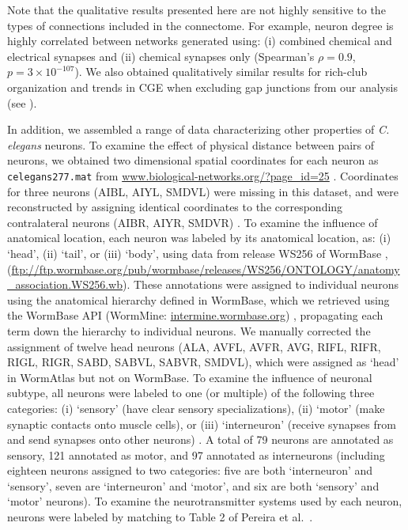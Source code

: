 \documentclass[10pt,letterpaper]{article}
\begin{document}
Note that the qualitative results presented here are not highly sensitive to the types of connections included in the connectome.
For example, neuron degree is highly correlated between networks generated using: (i) combined chemical and electrical synapses and (ii) chemical synapses only (Spearman's $\rho= 0.9$, $p = 3 \times 10^{-107}$).
We also obtained qualitatively similar results for rich-club organization and trends in CGE when excluding gap junctions from our analysis (see ).

In addition, we assembled a range of data characterizing other properties of \emph{C. elegans} neurons.
To examine the effect of physical distance between pairs of neurons, we obtained two dimensional spatial coordinates for each neuron as \texttt{celegans277.mat} from \url{www.biological-networks.org/?page_id=25} \cite{choe2004network}.
Coordinates for three neurons (AIBL, AIYL, SMDVL) were missing in this dataset, and were reconstructed by assigning identical coordinates to the corresponding contralateral neurons (AIBR, AIYR, SMDVR) \cite{Varier2011}.
To examine the influence of anatomical location, each neuron was labeled by its anatomical location, as:
(i) `head', (ii) `tail', or (iii) `body', using data from release WS256 of WormBase \cite{Harris:2009kd}, (\url{ftp://ftp.wormbase.org/pub/wormbase/releases/WS256/ONTOLOGY/anatomy_association.WS256.wb}).
These annotations were assigned to individual neurons using the anatomical hierarchy defined in WormBase, which we retrieved using the WormBase API (WormMine: \url{intermine.wormbase.org}) \cite{Harris:2009kd}, propagating each term down the hierarchy to individual neurons.
We manually corrected the assignment of twelve head neurons (ALA, AVFL, AVFR, AVG, RIFL, RIFR, RIGL, RIGR, SABD, SABVL, SABVR, SMDVL), which were assigned as `head' in WormAtlas \cite{WormAtlas} but not on WormBase.
To examine the influence of neuronal subtype, all neurons were labeled to one (or multiple) of the following three categories:
(i) `sensory' (have clear sensory specializations),
(ii) `motor' (make synaptic contacts onto muscle cells), or
(iii) `interneuron' (receive synapses from and send synapses onto other neurons) \cite{White:1986tx}.
A total of 79 neurons are annotated as sensory, 121 annotated as motor, and 97 annotated as interneurons (including eighteen neurons assigned to two categories: five are both `interneuron' and `sensory', seven are `interneuron' and `motor', and six are both `sensory' and `motor' neurons).
To examine the neurotransmitter systems used by each neuron, neurons were labeled by matching to Table 2 of Pereira et al.~\cite{Pereira:2015er}.
\end{document}
